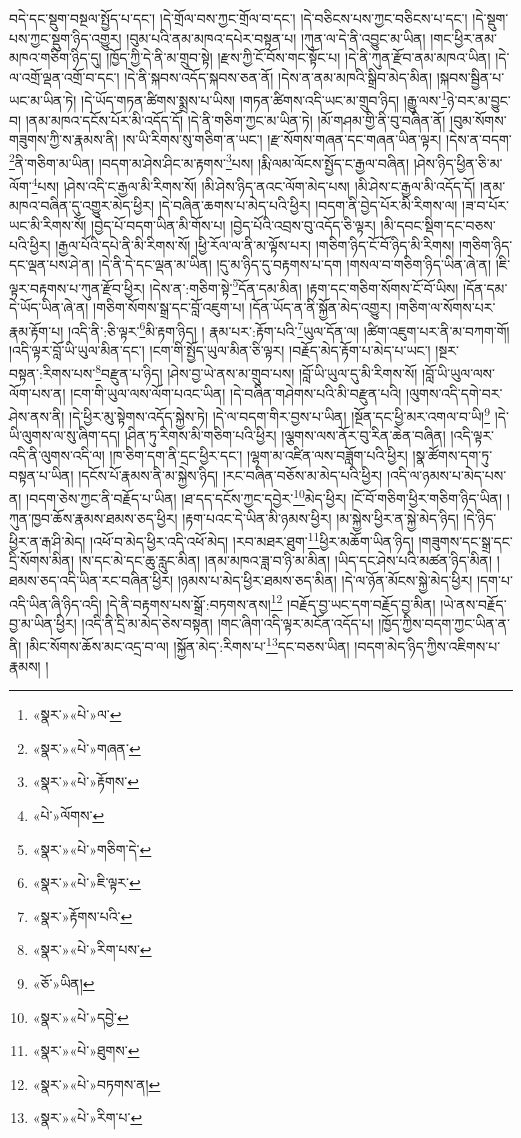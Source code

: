 བདེ་དང་སྡུག་བསྔལ་སྤྱོད་པ་དང་། །དེ་གྲོལ་བས་ཀྱང་གྲོལ་བ་དང་། །དེ་བཅིངས་པས་ཀྱང་བཅིངས་པ་དང་། །དེ་སྡུག་པས་ཀྱང་སྡུག་ཉིད་འགྱུར། །བུམ་པའི་ནམ་མཁའ་དཔེར་བསྟན་པ། །ཀུན་ལ་དེ་ནི་འབྱུང་མ་ཡིན། །གང་ཕྱིར་ནམ་མཁའ་གཅིག་ཉིད་དུ། །ཁྱོད་ཀྱི་དེ་ནི་མ་གྲུབ་སྟེ། །རྫས་ཀྱི་ངོ་བོས་གང་སྟོང་པ། །དེ་ནི་ཀུན་རྫོབ་ནམ་མཁའ་ཡིན། །དེ་ལ་འགྲོ་ལྡན་འགྲོ་བ་དང་། །དེ་ནི་སྐབས་འདོད་སྐབས་ཅན་ནོ། །དེས་ན་ནམ་མཁའི་སྒྲིབ་མེད་མིན། །སྐབས་སྦྱིན་པ་ཡང་མ་ཡིན་ཏེ། །དེ་ཡོད་གཏན་ཚིགས་སྨྲས་པ་ཡིས། །གཏན་ཚིགས་འདི་ཡང་མ་གྲུབ་ཉིད། །རྒྱུ་ལས་\footnote{«སྣར་»«པེ་»ལ་}ཉེ་བར་མ་བྱུང་བ། །ནམ་མཁའ་དངོས་པོར་མི་འདོད་དོ། །དེ་ནི་གཅིག་ཀྱང་མ་ཡིན་ཏེ། །མོ་གཤམ་གྱི་ནི་བུ་བཞིན་ནོ། །བུམ་སོགས་གཟུགས་ཀྱི་ས་རྣམས་ནི། །ས་ཡི་རིགས་སུ་གཅིག་ན་ཡང་། །རྫ་སོགས་གཞན་དང་གཞན་ཡིན་ལྟར། །དེས་ན་བདག་\footnote{«སྣར་»«པེ་»གཞན་}ནི་གཅིག་མ་ཡིན། །བདག་མ་ཤེས་ཤིང་མ་རྟགས་\footnote{«སྣར་»«པེ་»རྟོགས་}པས། །རྨི་ལམ་ལོངས་སྤྱོད་ང་རྒྱལ་བཞིན། །ཤེས་ཉིད་ཕྱིན་ཅི་མ་ལོག་\footnote{«པེ་»ལོགས་}པས། །ཤེས་འདི་ང་རྒྱལ་མི་རིགས་སོ། །མི་ཤེས་ཉིད་ནའང་ལོག་མེད་པས། །མི་ཤེས་ང་རྒྱལ་མི་འདོད་དོ། །ནམ་མཁའ་བཞིན་དུ་འགྱུར་མེད་ཕྱིར། །དེ་བཞིན་ཆགས་པ་མེད་པའི་ཕྱིར། །བདག་ནི་བྱེད་པོར་མི་རིགས་ལ། །ཟ་བ་པོར་ཡང་མི་རིགས་སོ། །བྱེད་པོ་བདག་ཡིན་མི་གོས་པ། །བྱེད་པོའི་འབྲས་བུ་འདོད་ཅི་ལྟར། །མི་དབང་སྡིག་དང་བཅས་པའི་ཕྱིར། །རྒྱལ་པོའི་དཔེ་ནི་མི་རིགས་སོ། །ཕྱི་རོལ་ལ་ནི་མ་ལྟོས་པར། །གཅིག་ཉིད་ངོ་བོ་ཉིད་མི་རིགས། །གཅིག་ཉིད་དང་ལྡན་པས་ཤེ་ན། །དེ་ནི་དེ་དང་ལྡན་མ་ཡིན། །དུ་མ་ཉིད་དུ་བརྟགས་པ་དག །གསལ་བ་གཅིག་ཉིད་ཡིན་ཞེ་ན། །ཇི་ལྟར་བརྟགས་པ་ཀུན་རྫོབ་ཕྱིར། །དེས་ན་:གཅིག་སྟེ་\footnote{«སྣར་»«པེ་»གཅིག་དེ་}དོན་དམ་མིན། །རྟག་དང་གཅིག་སོགས་ངོ་བོ་ཡིས། །དོན་དམ་དེ་ཡོད་ཡིན་ཞེ་ན། །གཅིག་སོགས་སྒྲ་དང་བློ་འཇུག་པ། །དོན་ཡོད་ན་ནི་སྐྱོན་མེད་འགྱུར། །གཅིག་ལ་སོགས་པར་རྣམ་རྟོག་པ། །འདི་ནི་:ཅི་ལྟར་\footnote{«སྣར་»«པེ་»ཇི་ལྟར་}མི་རྟག་ཉིད། །
རྣམ་པར་:རྟོག་པའི་\footnote{«སྣར་»རྟོགས་པའི་}ཡུལ་དོན་ལ། །ཚིག་འཇུག་པར་ནི་མ་བཀག་གོ། །འདི་ལྟར་བློ་ཡི་ཡུལ་མིན་དང་། །ངག་གི་སྤྱོད་ཡུལ་མིན་ཅི་ལྟར། །བརྗོད་མེད་རྟོག་པ་མེད་པ་ཡང་། །སྔར་བསྟན་:རིགས་པས་\footnote{«སྣར་»«པེ་»རིག་པས་}བརྫུན་པ་ཉིད། །ཤེས་བྱ་ཡེ་ནས་མ་གྲུབ་པས། །བློ་ཡི་ཡུལ་དུ་མི་རིགས་སོ། །བློ་ཡི་ཡུལ་ལས་ལོག་པས་ན། །ངག་གི་ཡུལ་ལས་ལོག་པའང་ཡིན། །དེ་བཞིན་གཤེགས་པའི་མི་བརྫུན་པའི། །ལུགས་འདི་དགེ་བར་ཤེས་ནས་ནི། །དེ་ཕྱིར་མུ་སྟེགས་འདོད་སྐྱེས་ཏེ། །དེ་ལ་བདག་གིར་བྱས་པ་ཡིན། །སྔོན་དང་ཕྱི་མར་འགལ་བ་ཡི།\footnote{«ཅོ་»ཡིན།} །དེ་ཡི་ལུགས་ལ་སུ་ཞིག་དད། །ཤིན་ཏུ་རིགས་མི་གཅིག་པའི་ཕྱིར། །ལྕགས་ལས་ནོར་བུ་རིན་ཆེན་བཞིན། །འདི་ལྟར་འདི་ནི་ལུགས་འདི་ལ། །ཁ་ཅིག་དག་ནི་དྲང་ཕྱིར་དང་། །ལྷག་མ་འཛིན་ལས་བཟློག་པའི་ཕྱིར། །སྣ་ཚོགས་དག་ཏུ་བསྟན་པ་ཡིན། །དངོས་པོ་རྣམས་ནི་མ་སྐྱེས་ཉིད། །རང་བཞིན་བཅོས་མ་མེད་པའི་ཕྱིར། །འདི་ལ་ཉམས་པ་མེད་པས་ན། །བདག་ཅེས་ཀྱང་ནི་བརྗོད་པ་ཡིན། །ཐ་དད་དངོས་ཀྱང་དབྱེར་\footnote{«སྣར་»«པེ་»དབྱེ་}མེད་ཕྱིར། །ངོ་བོ་གཅིག་ཕྱིར་གཅིག་ཉིད་ཡིན། །ཀུན་ཁྱབ་ཆོས་རྣམས་ཐམས་ཅད་ཕྱིར། །རྟག་པའང་དེ་ཡིན་མི་ཉམས་ཕྱིར། །མ་སྐྱེས་ཕྱིར་ན་སྐྱེ་མེད་ཉིད། །དེ་ཉིད་ཕྱིར་ན་རྒ་ཤི་མེད། །འཕོ་བ་མེད་ཕྱིར་འདི་འཕོ་མེད། །རབ་མཐར་ཐུག་\footnote{«སྣར་»«པེ་»ཐུགས་}ཕྱིར་མཆོག་ཡིན་ཉིད། །གཟུགས་དང་སྒྲ་དང་དྲི་སོགས་མིན། །ས་དང་མེ་དང་ཆུ་རླུང་མིན། །ནམ་མཁའ་ཟླ་བ་ཉི་མ་མིན། །ཡིད་དང་ཤེས་པའི་མཚན་ཉིད་མིན། །ཐམས་ཅད་འདི་ཡིན་རང་བཞིན་ཕྱིར། །ཉམས་པ་མེད་ཕྱིར་ཐམས་ཅད་མིན། །དེ་ལ་ཉོན་མོངས་སྐྱེ་མེད་ཕྱིར། །དག་པ་འདི་ཡིན་ཞི་ཉིད་འདི། །དེ་ནི་བརྟགས་པས་སྒྲོ་:བཏགས་ནས།\footnote{«སྣར་»«པེ་»བཏགས་ན།} །བརྗོད་བྱ་ཡང་དག་བརྗོད་བྱ་མིན། །ཡེ་ནས་བརྗོད་བྱ་མ་ཡིན་ཕྱིར། །འདི་ནི་དྲི་མ་མེད་ཅེས་བསྟན། །གང་ཞིག་འདི་ལྟར་མངོན་འདོད་པ། །ཁྱོད་ཀྱིས་བདག་ཀྱང་ཡིན་ན་ནི། །མིང་སོགས་ཆོས་མང་འདྲ་བ་ལ། །སྐྱོན་མེད་:རིགས་པ་\footnote{«སྣར་»«པེ་»རིག་པ་}དང་བཅས་ཡིན། །བདག་མེད་ཉིད་ཀྱིས་འཇིགས་པ་རྣམས། །

